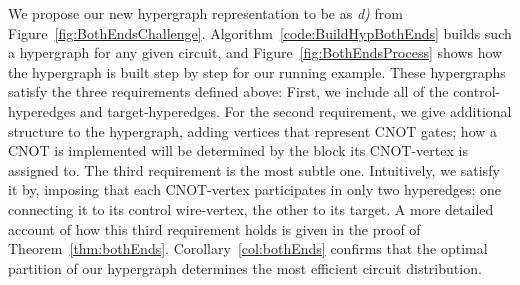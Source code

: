 We propose our new hypergraph representation to be as \textit{d)} from Figure~\ref{fig:BothEndsChallenge}. Algorithm~\ref{code:BuildHypBothEnds} builds such a hypergraph for any given circuit, and Figure~\ref{fig:BothEndsProcess} shows how the hypergraph is built step by step for our running example. These hypergraphs satisfy the three requirements defined above: First, we include all of the control-hyperedges and target-hyperedges. For the second requirement, we give additional structure to the hypergraph, adding vertices that represent CNOT gates; how a CNOT is implemented will be determined by the block its CNOT-vertex is assigned to. The third requirement is the most subtle one. Intuitively, we satisfy it by, imposing that each CNOT-vertex participates in only two hyperedges; one connecting it to its control wire-vertex, the other to its target. A more detailed account of how this third requirement holds is given in the proof of Theorem~\ref{thm:bothEnds}. Corollary~\ref{col:bothEnds} confirms that the optimal partition of our hypergraph determines the most efficient circuit distribution.


